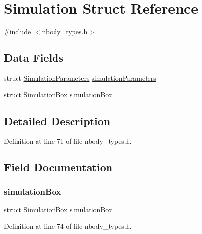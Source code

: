 \hypertarget{struct_simulation}{}\section{Simulation Struct Reference}
\label{struct_simulation}


{\ttfamily \#include $<$nbody\+\_\+types.\+h$>$}

\subsection*{Data Fields}
\begin{DoxyCompactItemize}
\item 
struct \hyperlink{struct_simulation_parameters}{Simulation\+Parameters} \hyperlink{struct_simulation_a8c68351d39c9cff958c6d970b948d5b0}{simulation\+Parameters}
\item 
struct \hyperlink{struct_simulation_box}{Simulation\+Box} \hyperlink{struct_simulation_a4e1149e437e8662a94a3086a53370e34}{simulation\+Box}
\end{DoxyCompactItemize}


\subsection{Detailed Description}


Definition at line 71 of file nbody\+\_\+types.\+h.



\subsection{Field Documentation}
\hypertarget{struct_simulation_a4e1149e437e8662a94a3086a53370e34}{}\label{struct_simulation_a4e1149e437e8662a94a3086a53370e34} 
\subsubsection{\texorpdfstring{simulation\+Box}{simulationBox}}
{\footnotesize\ttfamily struct \hyperlink{struct_simulation_box}{Simulation\+Box} simulation\+Box}



Definition at line 74 of file nbody\+\_\+types.\+h.

\hypertarget{struct_simulation_a8c68351d39c9cff958c6d970b948d5b0}{}\label{struct_simulation_a8c68351d39c9cff958c6d970b948d5b0} 
